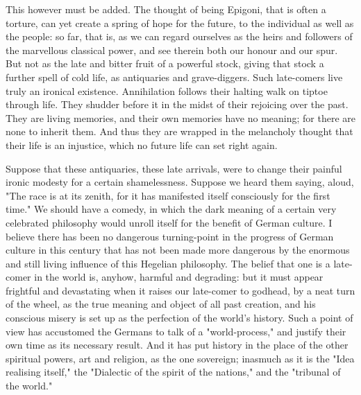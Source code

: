 This however must be added. The thought of being Epigoni, that is
often a torture, can yet create a spring of hope for the future, to
the individual as well as the people: so far, that is, as we can
regard ourselves as the heirs and followers of the marvellous
classical power, and see therein both our honour and our spur. But
not as the late and bitter fruit of a powerful stock, giving that
stock a further spell of cold life, as antiquaries and grave-diggers.
Such late-comers live truly an ironical existence. Annihilation
follows their halting walk on tiptoe through life. They shudder
before it in the midst of their rejoicing over the past. They are
living memories, and their own memories have no meaning; for there
are none to inherit them. And thus they are wrapped in the melancholy
thought that their life is an injustice, which no future life can set
right again.

Suppose that these antiquaries, these late arrivals, were to change
their painful ironic modesty for a certain shamelessness. Suppose we
heard them saying, aloud, "The race is at its zenith, for it has
manifested itself consciously for the first time." We should have a
comedy, in which the dark meaning of a certain very celebrated
philosophy would unroll itself for the benefit of German culture. I
believe there has been no dangerous turning-point in the progress of
German culture in this century that has not been made more dangerous
by the enormous and still living influence of this Hegelian
philosophy. The belief that one is a late-comer in the world is,
anyhow, harmful and degrading: but it must appear frightful and
devastating when it raises our late-comer to godhead, by a neat turn
of the wheel, as the true meaning and object of all past creation,
and his conscious misery is set up as the perfection of the world's
history. Such a point of view has accustomed the Germans to talk of a
"world-process," and justify their own time as its necessary result.
And it has put history in the place of the other spiritual powers,
art and religion, as the one sovereign; inasmuch as it is the "Idea
realising itself," the "Dialectic of the spirit of the nations," and
the "tribunal of the world."

